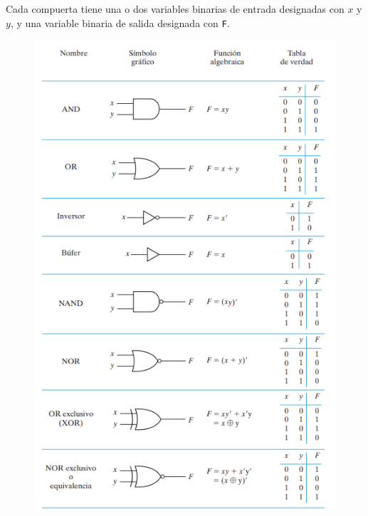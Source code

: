 Cada compuerta tiene una o dos variables binarias de entrada designadas con $x$ y $y$, y una variable binaria de salida designada con \texttt{F}. 

\begin{figure}[h]
\centering
\includegraphics[scale=0.75]{img/comp.png}
\end{figure}

